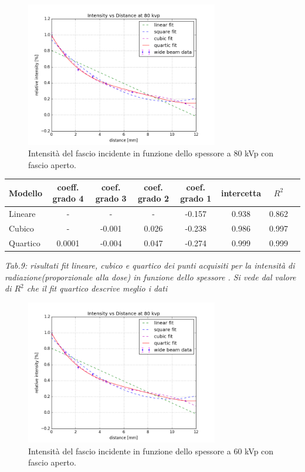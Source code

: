\documentclass[a4paper]{article}
\begin{document}
\begin{figure}[H]
\centering
\includegraphics[width=0.75\textwidth]{hvl80kvpwide.png}
\caption{Intensità del fascio incidente in funzione dello spessore a 80 kVp con fascio aperto.}
\end{figure}

\begin{center} 
		
		\begin{tabular}{lccccccc}
			\hline
			\hline
			\textbf{Modello}	& \textbf{coeff. grado 4}&\textbf{coef. grado 3}&\textbf{coef. grado 2}& \textbf{coef. grado 1}& \textbf{intercetta}&  \textbf{$R^{2}$} 	 \\
			\hline
			\hline
			Lineare	&-&-&-&-0.157&0.938&0.862	\\
			Cubico	&-&-0.001&0.026&-0.238&0.986&0.997\\
			Quartico &0.0001&-0.004&0.047&-0.274&0.999&0.999\\
			
			\hline
			\hline
		\end{tabular}
		\linebreak
		\emph{Tab.9: risultati fit lineare, cubico e quartico  dei punti acquisiti per la intensità di radiazione(proporzionale alla dose) in funzione dello spessore . Si vede dal valore di $R^{2}$ che il fit quartico descrive meglio i dati} 
	\end{center} 




\begin{figure}[H]
\centering
\includegraphics[width=0.75\textwidth]{hvl80kvpwide.png}
\caption{Intensità del fascio incidente in funzione dello spessore a 60 kVp con fascio aperto.}
\end{figure}
\end{document}
